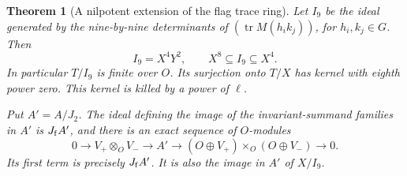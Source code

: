 \documentclass[a4paper,11pt]{article}
\newtheorem{theorem}[proposition]{Theorem}
\theoremstyle{definition}
\theoremstyle{remark}
\numberwithin{equation}{section}
\begin{document}
\begin{theorem}[A nilpotent extension of the flag trace ring]
\label{thm:flagthick385}
Let \(I_9\) be the ideal generated by the nine-by-nine determinants
of \((\operatorname{tr}M(h_i k_j))\), for \(h_i,k_j\in G\).
Then
\[
          I_9=X^4Y^2,\qquad X^8\subseteq I_9\subseteq X^4 .
\]
In particular \(T/I_9\) is finite over \(O\). Its surjection
onto \(T/X\) has kernel with eighth power zero. This kernel
is killed by a power of \(\ell\).

Put \(A'=A/J_2\). The ideal defining the image of the
invariant-summand families in \(A'\) is \(J_{\rm f}A'\),
and there is an exact sequence of \(O\)-modules
\[
 0\longrightarrow V_+\otimes_O V_-\longrightarrow A'
 \longrightarrow (O\oplus V_+)\times_O(O\oplus V_-)
 \longrightarrow0 .
\]
Its first term is precisely \(J_{\rm f}A'\). It is also the
image in \(A'\) of \(X/I_9\).
\end{theorem}
\end{document}
